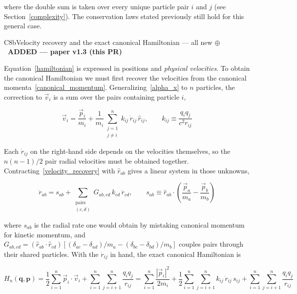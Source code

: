 \documentclass[12pt,a4paper]{article}
\theoremstyle{definition}
\theoremstyle{remark}
\newcommand{\newtag}{{\sffamily\bfseries\footnotesize
  \textcolor{newink}{$\oplus$~ADDED \textnormal{\textmd{— paper v1.3 (this PR)}}}}\par\smallskip}
\begin{document}
where the double sum is taken over every unique particle pair $i$ and $j$ (see Section~\ref{complexity}). The conservation laws stated previously still hold for this general case.

\begin{addbox}{C8b}{Velocity recovery and the exact canonical Hamiltonian --- all new}
\newtag
Equation~\eqref{hamiltonian} is expressed in positions and \textit{physical velocities}. To obtain the canonical Hamiltonian we must first recover the velocities from the canonical momenta~\eqref{canonical_momentum}. Generalizing~\eqref{alpha_x} to $n$ particles, the correction to $\vec{v}_i$ is a sum over the pairs containing particle $i$,

\begin{equation}\label{velocity_recovery}
    \vec{v}_i = \frac{\vec{p}_i}{m_i} + \frac{1}{m_i}\sum_{\substack{j=1 \\ j \neq i}}^{n} k_{ij}\,\dot{r}_{ij}\,\hat{r}_{ij}, \qquad k_{ij} \equiv \frac{q_i q_j}{c^2 r_{ij}}
\end{equation}

Each $\dot{r}_{ij}$ on the right-hand side depends on the velocities themselves, so the $n(n-1)/2$ pair radial velocities must be obtained together. Contracting~\eqref{velocity_recovery} with $\hat{r}_{ab}$ gives a linear system in those unknowns,

\begin{equation}\label{radial_system}
    \dot{r}_{ab} = s_{ab} + \sum_{\substack{\text{pairs} \\ (c,d)}} G_{ab,cd}\,k_{cd}\,\dot{r}_{cd}, \qquad s_{ab} \equiv \hat{r}_{ab}\cdot\left(\frac{\vec{p}_a}{m_a} - \frac{\vec{p}_b}{m_b}\right)
\end{equation}

where $s_{ab}$ is the radial rate one would obtain by mistaking canonical momentum for kinetic momentum, and $G_{ab,cd} = (\hat{r}_{ab}\cdot\hat{r}_{cd})\left[(\delta_{ac}-\delta_{ad})/m_a - (\delta_{bc}-\delta_{bd})/m_b\right]$ couples pairs through their shared particles. With the $\dot{r}_{ij}$ in hand, the exact canonical Hamiltonian is

\begin{equation}\label{hamiltonian_canonical}
    \boxed{H_n(\mathbf{q},\mathbf{p}) = \frac{1}{2}\sum_{i=1}^{n} \vec{p}_i \cdot \vec{v}_i + \sum_{i=1}^{n}\sum_{j=i+1}^{n} \frac{q_i q_j}{r_{ij}} = \sum_{i=1}^{n} \frac{|\vec{p}_i|^2}{2 m_i} + \frac{1}{2}\sum_{i=1}^{n}\sum_{j=i+1}^{n} k_{ij}\,\dot{r}_{ij}\,s_{ij} + \sum_{i=1}^{n}\sum_{j=i+1}^{n} \frac{q_i q_j}{r_{ij}}}
\end{equation}


\end{addbox}
\end{document}
